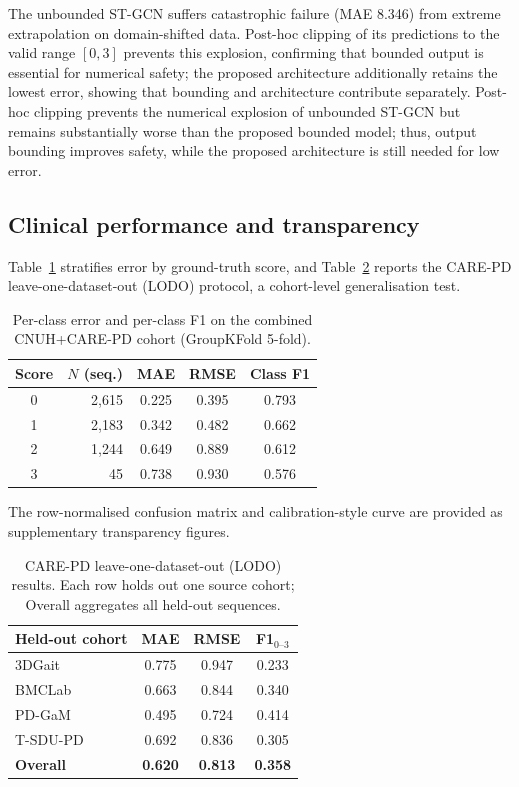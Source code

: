 \documentclass[preprint,12pt]{elsarticle}
\begin{document}
The unbounded ST-GCN suffers catastrophic failure (MAE 8.346) from extreme
extrapolation on domain-shifted data. Post-hoc clipping of its predictions to
the valid range $[0,3]$ prevents this explosion, confirming that bounded output
is essential for numerical safety; the proposed architecture additionally
retains the lowest error, showing that bounding and architecture contribute
separately.
Post-hoc clipping prevents the numerical explosion of unbounded ST-GCN but
remains substantially worse than the proposed bounded model; thus, output
bounding improves safety, while the proposed architecture is still needed for
low error.

\subsection{Clinical performance and transparency}
\label{sec:perclass}
Table~\ref{tab:perclass} stratifies error by ground-truth score, and
Table~\ref{tab:lodo} reports the CARE-PD leave-one-dataset-out (LODO)
protocol, a cohort-level generalisation test.

\begin{table}[htpb]
\centering
\caption{Per-class error and per-class F1 on the combined CNUH+CARE-PD cohort
(GroupKFold 5-fold).}
\label{tab:perclass}
\begin{tabular}{crccc}
\toprule
\textbf{Score} & \textbf{$N$ (seq.)} & \textbf{MAE} & \textbf{RMSE} &
\textbf{Class F1} \\
\midrule
0 & 2{,}615 & 0.225 & 0.395 & 0.793 \\
1 & 2{,}183 & 0.342 & 0.482 & 0.662 \\
2 & 1{,}244 & 0.649 & 0.889 & 0.612 \\
3 &    45  & 0.738 & 0.930 & 0.576 \\
\bottomrule
\end{tabular}
\end{table}
The row-normalised confusion matrix and calibration-style curve are provided as
supplementary transparency figures.

\begin{table}[htpb]
\centering
\caption{CARE-PD leave-one-dataset-out (LODO) results. Each row holds out one
source cohort; Overall aggregates all held-out sequences.}
\label{tab:lodo}
\begin{tabular}{lccc}
\toprule
\textbf{Held-out cohort} & \textbf{MAE} & \textbf{RMSE} &
\textbf{F1$_{0\text{--}3}$} \\
\midrule
3DGait    & 0.775 & 0.947 & 0.233 \\
BMCLab    & 0.663 & 0.844 & 0.340 \\
PD-GaM    & 0.495 & 0.724 & 0.414 \\
T-SDU-PD  & 0.692 & 0.836 & 0.305 \\
\midrule
\textbf{Overall} & \textbf{0.620} & \textbf{0.813} & \textbf{0.358} \\
\bottomrule
\end{tabular}
\end{table}
\end{document}
